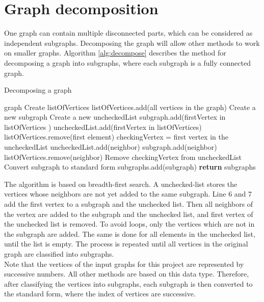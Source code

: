 \documentclass[a4paper]{report}
\begin{document}
		\section{Graph decomposition}
		One graph can contain multiple disconnected parts, which can be considered as independent subgraphs. Decomposing the graph will allow other methods to work on smaller graphs. Algorithm \ref{alg:decompose} describes the method for decomposing a graph into subgraphs, where each subgraph is a fully connected graph.\\
		\begin{algorithm}
			\caption{Decomposing a graph}
			\label{alg:decompose}
			\begin{algorithmic}[1]
				\REQUIRE graph
				\STATE Create listOfVertices 
				\STATE listOfVertices.add(all vertices in the graph)
				\STATE Create a new subgraph
				\STATE Create a new uncheckedList
				\STATE subgraph.add(firstVertex in listOfVertices )
				\STATE uncheckedList.add(firstVertex in listOfVertices)
				\STATE listOfVertices.remove(first element)
				\STATE checkingVertex = first vertex in the uncheckedList
				\STATE uncheckedList.add(neighbor)
				\STATE subgraph.add(neighbor)
				\ENDIF
				\STATE listOfVertices.remove(neighbor)
				\ENDFOR
				\STATE Remove checkingVertex from uncheckedList
				\ENDWHILE
				\STATE Convert subgraph to standard form
				\STATE subgraphs.add(subgraph)
				\ENDWHILE
				\STATE \textbf{return} subgraphs
				
			\end{algorithmic}
		\end{algorithm}
		The algorithm is based on breadth-first search. A unchecked-list stores the vertices whose neighbors are not yet added to the same subgraph. Line 6 and 7 add the first vertex to a subgraph and the unchecked list. Then all neighbors of the vertex are added to the subgraph and the unchecked list, and first vertex of the unchecked list is removed. To avoid loops, only the vertices which are not in the subgraph are added. The same is done for all elements in the unchecked list, until the list is empty. The process is repeated until all vertices in the original graph are classified into subgraphs.\\
		Note that the vertices of the input graphs for this project are represented by successive numbers. All other methods are based on this data type. Therefore, after classifying the vertices into subgraphs, each subgraph is then converted to the standard form, where the index of vertices are successive.
		
\end{document}

